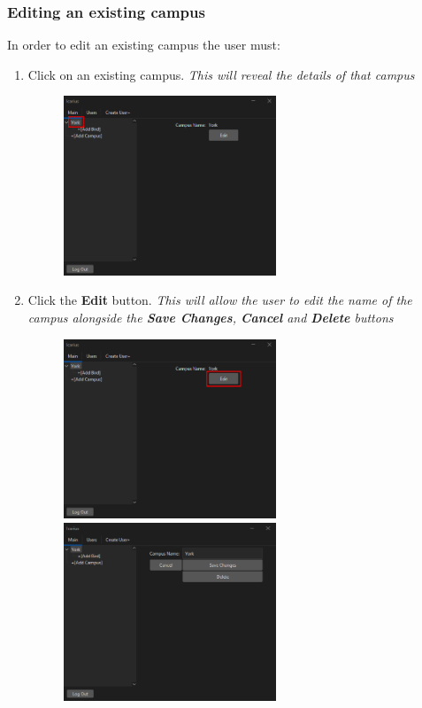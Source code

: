 \subsubsection{Editing an existing campus}
In order to edit an existing campus the user must:
\begin{enumerate}
    \item Click on an existing campus. \textit{This will reveal the details of that campus}
    \begin{figure}[H]
        \centering
        \includegraphics[width=0.6\textwidth]{MainTab/EditCampus/viewCampus.PNG}        
    \end{figure}

    \item Click the \textbf{Edit} button. \textit{This will allow the user to edit the name of the campus alongside the \textbf{Save Changes}, \textbf{Cancel} and \textbf{Delete} buttons } 
    \begin{figure}[H]
        \centering
        \includegraphics[width=0.6\textwidth]{MainTab/EditCampus/editCampus.PNG}
        \includegraphics[width=0.6\textwidth]{MainTab/EditCampus/editCampusView.PNG}
    \end{figure}


\end{enumerate}
